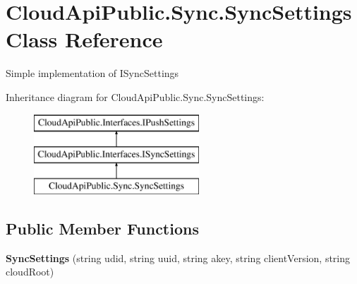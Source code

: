 \hypertarget{class_cloud_api_public_1_1_sync_1_1_sync_settings}{\section{Cloud\-Api\-Public.\-Sync.\-Sync\-Settings Class Reference}
\label{class_cloud_api_public_1_1_sync_1_1_sync_settings}
}


Simple implementation of I\-Sync\-Settings  


Inheritance diagram for Cloud\-Api\-Public.\-Sync.\-Sync\-Settings\-:\begin{figure}[H]
\begin{center}
\leavevmode
\includegraphics[height=3.000000cm]{class_cloud_api_public_1_1_sync_1_1_sync_settings}
\end{center}
\end{figure}
\subsection*{Public Member Functions}
\begin{DoxyCompactItemize}
\item 
\hypertarget{class_cloud_api_public_1_1_sync_1_1_sync_settings_a3d84f8526982a395406668716e207fae}{{\bfseries Sync\-Settings} (string udid, string uuid, string akey, string client\-Version, string cloud\-Root)}\label{class_cloud_api_public_1_1_sync_1_1_sync_settings_a3d84f8526982a395406668716e207fae}

\end{DoxyCompactItemize}
